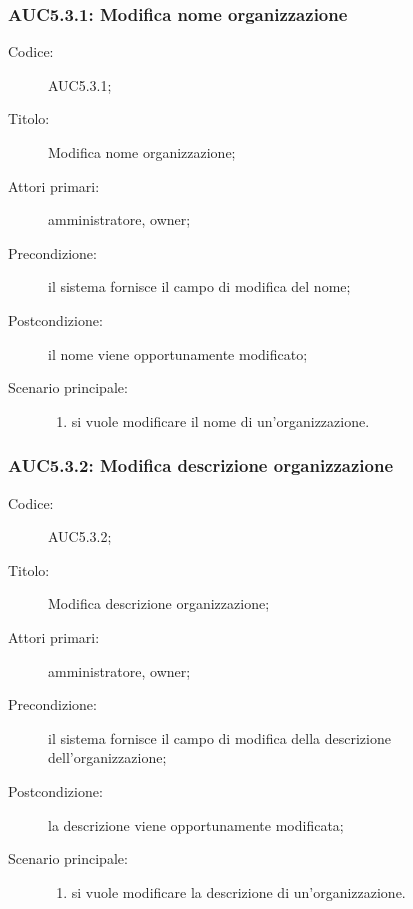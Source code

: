 \documentclass[../../../analisi-dei-requisiti.tex]{subfiles}
\begin{document}
\subsubsection{AUC5.3.1: Modifica nome organizzazione}%
\label{subs:AUC5.3.1}
\begin{description}
  \item[Codice:] AUC5.3.1;
  \item[Titolo:] Modifica nome organizzazione;
  \item[Attori primari:] amministratore, owner;
  \item[Precondizione:] il sistema fornisce il campo di modifica del nome;
  \item[Postcondizione:] il nome viene opportunamente modificato;
  \item[Scenario principale:]
        \begin{enumerate}
          \item si vuole modificare il nome di un'organizzazione.
        \end{enumerate}
\end{description}

\subsubsection{AUC5.3.2: Modifica descrizione organizzazione}%
\label{subs:AUC5.3.2}
\begin{description}
  \item[Codice:] AUC5.3.2;
  \item[Titolo:] Modifica descrizione organizzazione;
  \item[Attori primari:] amministratore, owner;
  \item[Precondizione:] il sistema fornisce il campo di modifica della descrizione dell'organizzazione;
  \item[Postcondizione:] la descrizione viene opportunamente modificata;
  \item[Scenario principale:]
        \begin{enumerate}
          \item si vuole modificare la descrizione di un'organizzazione.
        \end{enumerate}
\end{description}
\end{document}
